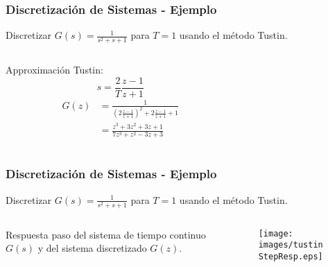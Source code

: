 \documentclass[aspectratio=169]{beamer}
\theoremstyle{definition}
\theoremstyle{plain}
\theoremstyle{remark}
\begin{document}
\begin{frame}[c]\frametitle{Discretización de Sistemas - Ejemplo}
	\vspace*{3mm}	
	Discretizar $G(s) = \frac{1}{s^2 + s + 1}$ para $T=1$ usando el método Tustin.\\
	\pause
	\vspace*{4mm}	
	\begin{columns}
		\begin{column}{0.3\textwidth}
			Approximación Tustin:
			\begin{equation*}
				s = \frac{2}{T}\frac{z-1}{z+1}
			\end{equation*}
			\pause
			\begin{align*}
				G(z) &= \frac{1}{\left(2\frac{z-1}{z+1}\right)^2 + 2\frac{z-1}{z+1} + 1}\\
				&= \frac{z^3+3z^2+3z+1}{7z^3+z^2-3z+3}
			\end{align*}
		\end{column}
		\pause
		\begin{column}{0.7\textwidth}
			
		\end{column}
	\end{columns}
\end{frame}

\begin{frame}[c]\frametitle{Discretización de Sistemas - Ejemplo}
	\vspace*{3mm}	
	Discretizar $G(s) = \frac{1}{s^2 + s + 1}$ para $T=1$ usando el método Tustin.\\
	\begin{columns}
		\begin{column}{0.3\textwidth}
			Respuesta paso del sistema de tiempo continuo $G(s)$ y del sistema discretizado $G(z)$.
		\end{column}
		\begin{column}{0.7\textwidth}
			\begin{figure}
				\centering
				\texttt{[image: images/tustinStepResp.eps]}
			\end{figure}
		\end{column}
	\end{columns}
\end{frame}
\end{document}
